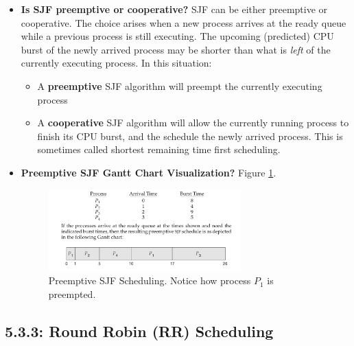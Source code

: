 \documentclass[12pt]{article}
\begin{document}
\begin{itemize}
    \item \textbf{Is SJF preemptive or cooperative?} SJF can be either preemptive or cooperative. The choice arises when a new process arrives at the ready queue while a previous process is still executing. The upcoming (predicted) CPU burst of the newly arrived process may be shorter than what is \textit{left} of the currently executing process. In this situation:
        \begin{itemize}
            \item A \textbf{preemptive} SJF algorithm will preempt the currently executing process
            \item A \textbf{cooperative} SJF algorithm will allow the currently running process to finish its CPU burst, and the schedule the newly arrived process. This is sometimes called shortest remaining time first scheduling.
        \end{itemize}
    \item \textbf{Preemptive SJF Gantt Chart Visualization?} Figure \ref{fig:sjf-preemptive-scheduling}.
        \begin{figure}[ht]
            \centering
            \includegraphics[width=0.7\textwidth]{figures/sjf-preemptive-scheduling.jpg}
            \caption{Preemptive SJF Scheduling. Notice how process \(P_1\) is preempted.}
            \label{fig:sjf-preemptive-scheduling}
        \end{figure}
\end{itemize}

\subsection*{5.3.3: Round Robin (RR) Scheduling}
\end{document}
